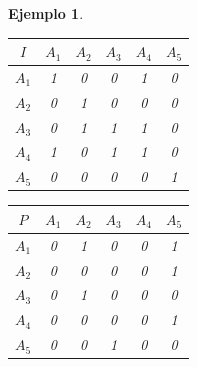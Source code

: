 \documentclass[a5paper,doc,10pt,noapacite]{apa6}
\newtheorem{ejem}{Ejemplo}
\begin{document}
{{\begin{ejem}
\begin{table}[H]
   \fontsize{7}{11}\selectfont
    \begin{minipage}{.5\linewidth}
      \centering
	\begin{tabular}{c|ccccc} \thickline
	\(I\) & \(A_1\) & \(A_2\) & \(A_3\) & \(A_4\) & \(A_5\)  \\ \hline
    \(A_1\) & 1 & 0 & 0 & 1 & 0  \\
    \(A_2\) & 0 & 1 & 0 & 0 & 0  \\
	\(A_3\) & 0 & 1 & 1 & 1 & 0   \\
	\(A_4\) & 1 & 0 & 1 & 1 & 0   \\
	\(A_5\) & 0 & 0 & 0 & 0 & 1   \\
\end{tabular}
\label{tab:B4} 
    \end{minipage}%
    \begin{minipage}{.5\linewidth}
      \centering
	\begin{tabular}{c|ccccc} \thickline
	\(P\) & \(A_1\) & \(A_2\) & \(A_3\) & \(A_4\) & \(A_5\)  \\ \hline
    \(A_1\) & 0 & 1 & 0 & 0 & 1  \\
    \(A_2\) & 0 & 0 & 0 & 0 & 1  \\
	\(A_3\) & 0 & 1 & 0 & 0 & 0   \\
	\(A_4\) & 0 & 0 & 0 & 0 & 1   \\
	\(A_5\) & 0 & 0 & 1 & 0 & 0   \\
\end{tabular}
\label{tab:B5} 
    \end{minipage} 
\end{table}

%


\end{ejem}}}
\end{document}
